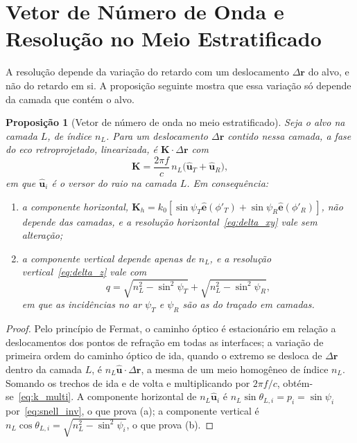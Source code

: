 \documentclass[12pt,a4paper,oneside]{book}
\theoremstyle{remark}
\newcommand{\vect}[1]{\boldsymbol{#1}}
\theoremstyle{plain}
\newtheorem{proposicao}{Proposição}[chapter]
\theoremstyle{definition}
\begin{document}
\section{Vetor de Número de Onda e Resolução no Meio Estratificado}
\label{sec:multi_resol}

A resolução depende da variação do retardo com um deslocamento $\Delta\vect r$
do alvo, e não do retardo em si. A proposição seguinte mostra que essa variação
só depende da camada que contém o alvo.

\begin{proposicao}[Vetor de número de onda no meio estratificado]
\label{prop:k_multi}
Seja o alvo na camada $L$, de índice $n_L$. Para um deslocamento $\Delta\vect r$
contido nessa camada, a fase do eco retroprojetado, linearizada, é
$\vect K\cdot\Delta\vect r$ com
\begin{equation}
  \vect K = \frac{2\pi f}{c}\,n_L\big(\hat{\vect u}_{T}+\hat{\vect u}_{R}\big),
  \label{eq:k_multi}
\end{equation}
em que $\hat{\vect u}_i$ é o versor do raio na camada $L$. Em consequência:
\begin{enumerate}[label=(\alph*)]
  \item a componente horizontal, $\vect K_h=k_0[\sin\psi_T\hat{\vect e}(\phi'_T)+
  \sin\psi_R\hat{\vect e}(\phi'_R)]$, não depende das camadas, e a resolução
  horizontal~\eqref{eq:delta_xy} vale sem alteração;
  \item a componente vertical depende apenas de $n_L$, e a resolução
  vertical~\eqref{eq:delta_z} vale com
  \begin{equation}
    q=\sqrt{n_L^2-\sin^2\psi_T}+\sqrt{n_L^2-\sin^2\psi_R},
    \label{eq:q_multi}
  \end{equation}
  em que as incidências no ar $\psi_T$ e $\psi_R$ são as do traçado em camadas.
\end{enumerate}
\end{proposicao}

\begin{proof}
Pelo princípio de Fermat, o caminho óptico é estacionário em relação a
deslocamentos dos pontos de refração em todas as interfaces; a variação de
primeira ordem do caminho óptico de ida, quando o extremo se desloca de
$\Delta\vect r$ dentro da camada $L$, é $n_L\hat{\vect u}\cdot\Delta\vect r$, a
mesma de um meio homogêneo de índice $n_L$. Somando os trechos de ida e de volta e
multiplicando por $2\pi f/c$, obtém-se~\eqref{eq:k_multi}. A componente
horizontal de $n_L\hat{\vect u}_i$ é $n_L\sin\theta_{L,i}=p_i=\sin\psi_i$
por~\eqref{eq:snell_inv}, o que prova (a); a componente vertical é
$n_L\cos\theta_{L,i}=\sqrt{n_L^2-\sin^2\psi_i}$, o que prova (b).
\end{proof}
\end{document}

